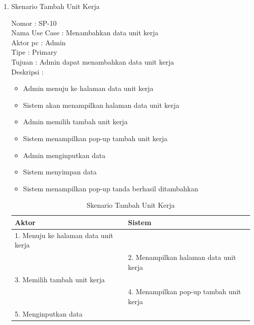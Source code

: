 \begin{enumerate}
\begin{table}
\begin{tabular}{ | p{50mm} | p{70mm} |}
		\hline
		
	\end{tabular}
\end{table}

\item Skenario Tambah Unit Kerja

Nomor \kern 3.6pc : SP-10 \\
Nama Use Case : Menambahkan data unit kerja \\
Aktor  pc : Admin \\
Tipe \kern 4.6pc : Primary \\
Tujuan \kern 3.6pc : Admin dapat menambahkan data unit kerja \\
Deskripsi \kern 2.5pc : 

\begin{itemize}
	\item Admin menuju ke halaman data unit kerja
	\item Sistem akan menampilkan halaman data unit kerja
	\item Admin memilih tambah unit kerja
	\item Sistem menampilkan pop-up tambah unit kerja
	\item Admin menginputkan data
	\item Sistem menyimpan data
	\item Sistem menampilkan pop-up tanda berhasil ditambahkan
	
\end{itemize}

\begin{table}
	\caption{Skenario Tambah Unit Kerja}
	\centering
	\begin{tabular}{ | l | p{65mm} |}
		\hline 
		\textbf{Aktor} & \textbf{Sistem} \\
		\hline
		
		1.	Menuju ke halaman data unit kerja &  \\
		
		\hline
		
		&  2.	Menampilkan halaman data unit kerja \\
		
		\hline
		
		3. Memilih tambah unit kerja & \\
		
		\hline
		
		& 4.	Menampilkan pop-up tambah unit kerja \\
		
		\hline
		
		5.	Menginputkan data  & \\
		\hline
		

\end{tabular}
\end{table}
\end{enumerate}
